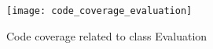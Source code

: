 \endgroup
\thispagestyle{empty}

\begin{figure}[h]
	\centering
	\texttt{[image: code\_coverage\_evaluation]}
	\caption{Code coverage related to class Evaluation}\label{fig:code_coverage_evaluation}
\end{figure}


